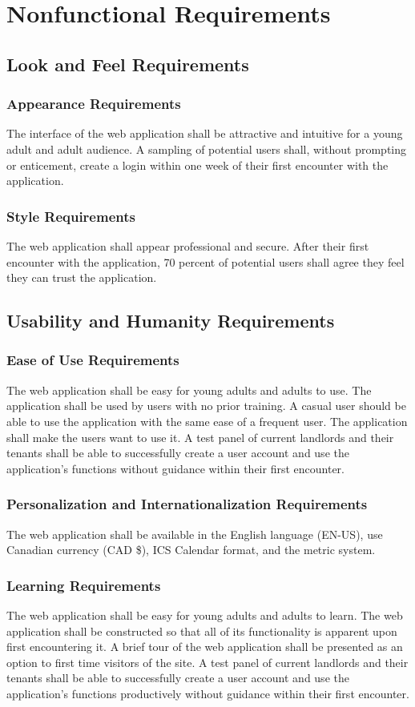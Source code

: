 \documentclass[12pt, titlepage]{article}
\begin{document}
{\section{Nonfunctional Requirements}
\subsection{Look and Feel Requirements}
\subsubsection{Appearance Requirements}
The interface of the web application shall be attractive and intuitive for a 
young adult and adult audience. A sampling of potential users shall, without 
prompting or enticement, create a login within one week of their first encounter 
with the application. 
\subsubsection{Style Requirements}
The web application shall appear professional and secure. After their first 
encounter with the application, 70 percent of potential users shall agree they 
feel they can trust the application. 
\subsection{Usability and Humanity Requirements}
\subsubsection{Ease of Use Requirements}
The web application shall be easy for young adults and adults to use. The 
application shall be used by users with no prior training. A casual user should 
be able to use the application with the same ease of a frequent user. The 
application shall make the users want to use it. A test panel of current 
landlords and their tenants shall be able to successfully create a user account 
and use the application's functions without guidance within their first 
encounter.
\subsubsection{Personalization and Internationalization Requirements}
The web application shall be available in the English language (EN-US),  use 
Canadian currency (CAD \$), ICS Calendar format, and the metric system.
\subsubsection{Learning Requirements}
The web application shall be easy for young adults and adults to learn. The web 
application shall be constructed so that all of its functionality is apparent 
upon first encountering it. A brief tour of the web application shall be 
presented as an option to first time visitors of the site. A test panel of 
current landlords and their tenants shall be able to successfully create a user 
account and use the application's functions productively without guidance within 
their first encounter.
}
\end{document}
